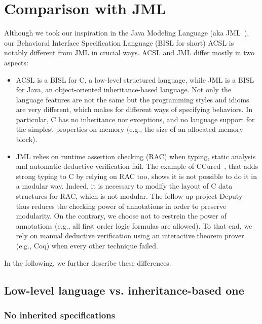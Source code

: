 \section{Comparison with JML}
\label{sec:comp-jml}

Although we took our inspiration in the Java Modeling Language (aka
JML~\cite{jmlhomepage}), our Behavioral Interface Specification
Language (BISL for short) ACSL is notably different from JML in
crucial ways. ACSL and JML differ mostly in two aspects:

\begin{itemize}
\item ACSL is a BISL for C, a low-level structured language, while JML
  is a BISL for Java, an object-oriented inheritance-based
  language. Not only the language features are not the same but the
  programming styles and idioms are very different, which makes for
  different ways of specifying behaviors. In particular, C has no
  inheritance nor exceptions, and no language support for the simplest
  properties on memory (e.g., the size of an allocated memory block).
\item JML relies on runtime assertion checking (RAC) when typing,
  static analysis and automatic deductive verification fail. The
  example of CCured~\cite{necula02ccured,condit03ccured}, that adds
  strong typing to C by relying on RAC too, shows it is not possible
  to do it in a modular way. Indeed, it is necessary to modify the
  layout of C data structures for RAC, which is not modular. The
  follow-up project Deputy~\cite{condit07deputy} thus reduces the
  checking power of annotations in order to preserve modularity.  On
  the contrary, we choose not to restrein the power of annotations
  (e.g., all first order logic formulas are allowed). To that end, we
  rely on manual deductive verification using an interactive theorem
  prover (e.g., Coq) when every other technique failed.
\end{itemize}

\noindent
In the following, we further describe these differences.

\subsection{Low-level language vs. inheritance-based one}

\subsubsection*{No inherited specifications}

